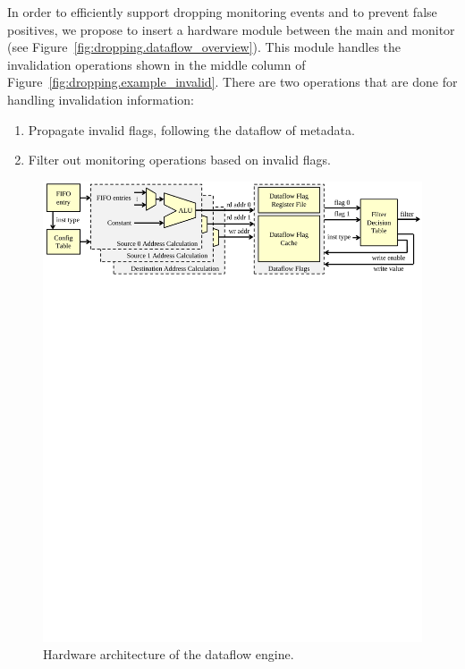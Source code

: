 In order to efficiently support dropping monitoring events and to prevent false
positives, we propose to insert a hardware module between the main and
monitor (see Figure~\ref{fig:dropping.dataflow_overview}). 
This module handles the invalidation operations shown in the middle column of
Figure~\ref{fig:dropping.example_invalid}.
There are two operations that are done for handling invalidation information:

\begin{enumerate}
  \item Propagate invalid flags, following the dataflow of metadata.
  \item Filter out monitoring operations based on invalid flags.
\end{enumerate}

\begin{figure}
  \begin{center}
    \includegraphics[]{figs/dataflow_architecture.pdf}
    \vspace{-0.2in}
    \caption{Hardware architecture of the dataflow engine.}
    \label{fig:dropping.dataflow} 
    \vspace{-0.1in}
  \end{center}
\end{figure}

